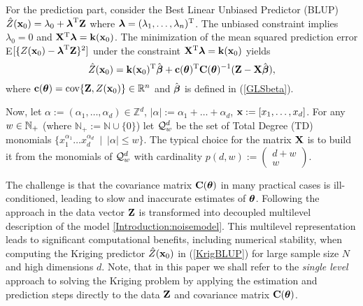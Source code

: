 \documentclass[11pt,final]{amsart}       %
\begin{document}


For the prediction part, consider the Best Linear Unbiased Predictor
(BLUP) $\hat Z(\mathbf{x}_0)=\lambda_0+\boldsymbol{\lambda}^{\rm T}\mathbf{Z}$ where
$\boldsymbol{\lambda}=(\lambda_1,\ldots,\lambda_n)^{\rm T}$. The unbiased constraint
implies $\lambda_0=0$ and $\mathbf{X}^{\rm T}\boldsymbol{\lambda}=\mathbf{k}(\mathbf{x}_0)$.  The
minimization of the mean squared prediction error
E$[\{Z(\mathbf{x}_0)-\boldsymbol{\lambda}^{\rm T}\mathbf{Z}\}^2]$ under the constraint
$\mathbf{X}^{\rm T}\boldsymbol{\lambda}=\mathbf{k}(\mathbf{x}_0)$ yields
\begin{equation}
\hat Z(\mathbf{x}_0)=\mathbf{k}(\mathbf{x}_0)^{\rm T}\hat {\boldsymbol{\beta}}+\mathbf{c}(\boldsymbol{\theta})^{\rm T}
\mathbf{C}(\boldsymbol{\theta})^{-1}(\mathbf{Z}-\mathbf{X}\hat {\boldsymbol{\beta}}), \label{KrigBLUP}
\end{equation}
where $\mathbf{c}(\boldsymbol{\theta})=\hbox{cov}\{\mathbf{Z},Z(\mathbf{x}_0)\}\in \Bbb{R}^{n}$ and $\hat {\boldsymbol{\beta}}$ is
defined in (\ref{GLSbeta}).  

Now, let $\alpha:= (\alpha_{1},\dots,\alpha_{d}) \in \mathbb{Z}{^d}$,
$|\alpha| := \alpha_{1}+\dots+\alpha_{d}$, $\mathbf{x} : =
[x_1,\dots,x_d]$. For any $w \in \mathbb{N}_+$ (where $\mathbb{N}_+ :=
\mathbb{N} \cup \{0\}$) let ${\mathcal Q}^d_w$ be the set of Total Degree (TD)
monomials $\{x_1^{\alpha_1} \dots x_d^{\alpha_d}\,\,\,|\,\,\, |\alpha|
\leq w\}$. The typical choice for the matrix $\mathbf{X}$ is to build it from
the monomials of ${\mathcal Q}^d_w$ with cardinality
$p(d,w):=\begin{pmatrix} d + w \\ w \end{pmatrix}$.

The challenge is that the covariance matrix $\mathbf{C}(\boldsymbol{\theta})$ in many
practical cases is ill-conditioned, leading to slow and inaccurate
estimates of $\boldsymbol{\theta}$. Following the approach in
\cite{Castrillon2015} the data vector $\mathbf{Z}$ is transformed into
decoupled multilevel description of the model
\eqref{Introduction:noisemodel}.  This multilevel representation leads
to significant computational benefits, including numerical stability,
when computing the Kriging predictor $\hat Z(\mathbf{x}_0)$ in
(\ref{KrigBLUP}) for large sample size $N$ and high dimensions $d$.
Note, that in this paper we shall refer to the \emph{single level}
approach to solving the Kriging problem by applying the estimation and
prediction steps directly to the data $\mathbf{Z}$ and covariance matrix
$\mathbf{C}(\boldsymbol{\theta})$.
\end{document}
